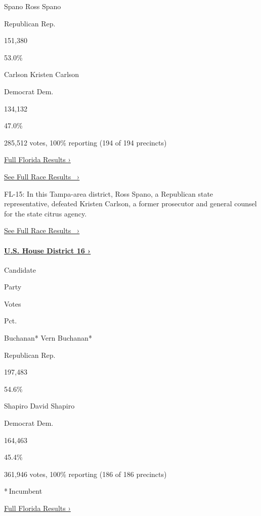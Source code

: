  Spano Ross Spano

Republican Rep.

151,380

53.0\%

 Carlson Kristen Carlson

Democrat Dem.

134,132

47.0\%

285,512 votes, 100\% reporting (194 of 194 precincts)

\href{https://www.nytimes3xbfgragh.onion/interactive/2018/11/06/us/elections/results-florida-elections.html}{Full
Florida Results ›}

\href{https://www.nytimes3xbfgragh.onion/elections/results/florida-house-district-15}{See
Full Race Results~ ›}

FL-15: In this Tampa-area district, Ross Spano, a Republican state
representative, defeated Kristen Carlson, a former prosecutor and
general counsel for the state citrus agency.

\href{https://www.nytimes3xbfgragh.onion/elections/results/florida-house-district-15}{See
Full Race Results~ ›}

\hypertarget{us-house-district-16-}{%
\paragraph{\texorpdfstring{\href{https://www.nytimes3xbfgragh.onion/elections/results/florida-house-district-16}{U.S.
House District 16
›}}{U.S. House District 16 ›}}\label{us-house-district-16-}}

Candidate

Party

Votes

Pct.

 Buchanan* Vern Buchanan*

Republican Rep.

197,483

54.6\%

 Shapiro David Shapiro

Democrat Dem.

164,463

45.4\%

361,946 votes, 100\% reporting (186 of 186 precincts)

* Incumbent

\href{https://www.nytimes3xbfgragh.onion/interactive/2018/11/06/us/elections/results-florida-elections.html}{Full
Florida Results ›}

